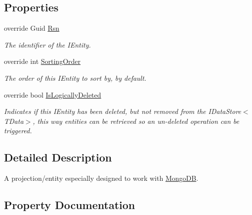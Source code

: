 \subsection*{Properties}
\begin{DoxyCompactItemize}
\item 
override Guid \hyperlink{classCqrs_1_1Mongo_1_1Entities_1_1MongoEntity_a445634030176c4991c0de152981c19ce_a445634030176c4991c0de152981c19ce}{Rsn}
\begin{DoxyCompactList}\small\item\em The identifier of the I\+Entity. \end{DoxyCompactList}\item 
override int \hyperlink{classCqrs_1_1Mongo_1_1Entities_1_1MongoEntity_a2f22c031f0aaa7b1b5eb6798d43d1ed2_a2f22c031f0aaa7b1b5eb6798d43d1ed2}{Sorting\+Order}
\begin{DoxyCompactList}\small\item\em The order of this I\+Entity to sort by, by default. \end{DoxyCompactList}\item 
override bool \hyperlink{classCqrs_1_1Mongo_1_1Entities_1_1MongoEntity_a4dddb6f6df1cad227b817e5f54a3e211_a4dddb6f6df1cad227b817e5f54a3e211}{Is\+Logically\+Deleted}
\begin{DoxyCompactList}\small\item\em Indicates if this I\+Entity has been deleted, but not removed from the I\+Data\+Store$<$\+T\+Data$>$, this way entities can be retrieved so an un-\/deleted operation can be triggered. \end{DoxyCompactList}\end{DoxyCompactItemize}


\subsection{Detailed Description}
A projection/entity especially designed to work with \hyperlink{namespaceCqrs_1_1MongoDB}{Mongo\+DB}. 



\subsection{Property Documentation}
\mbox{\label{classCqrs_1_1Mongo_1_1Entities_1_1MongoEntity_a4dddb6f6df1cad227b817e5f54a3e211_a4dddb6f6df1cad227b817e5f54a3e211}} 
